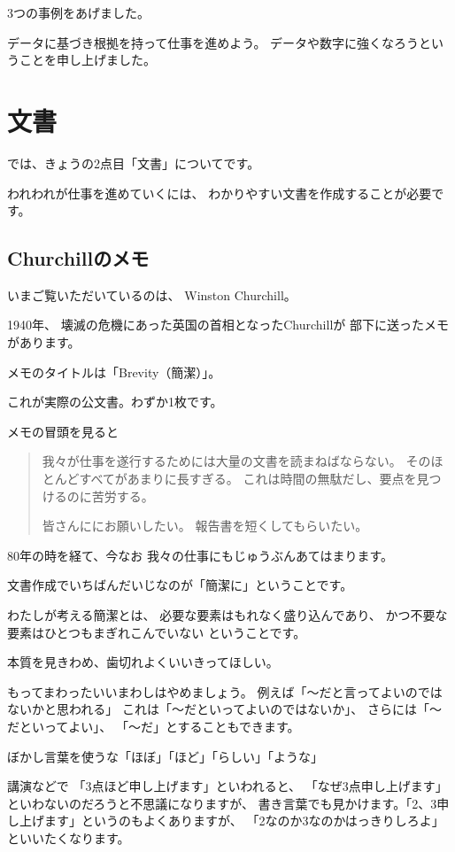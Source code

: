 \documentclass[uplatex,jis2004,dvipdfmx,12pt]{jsarticle}
\begin{document}
3つの事例をあげました。

データに基づき根拠を持って仕事を進めよう。
データや数字に強くなろうということを申し上げました。


\section{文書}

では、きょうの2点目「文書」についてです。

われわれが仕事を進めていくには、
わかりやすい文書を作成することが必要です。

\subsection{Churchillのメモ}

いまご覧いただいているのは、
Winston Churchill。

1940年、
壊滅の危機にあった英国の首相となったChurchillが
部下に送ったメモがあります。

メモのタイトルは「Brevity（簡潔）」。

これが実際の公文書。わずか1枚です。

メモの冒頭を見ると

\begin{quote}
我々が仕事を遂行するためには大量の文書を読まねばならない。
そのほとんどすべてがあまりに長すぎる。
これは時間の無駄だし、要点を見つけるのに苦労する。

皆さんににお願いしたい。
報告書を短くしてもらいたい。
\end{quote}



80年の時を経て、今なお
我々の仕事にもじゅうぶんあてはまります。

文書作成でいちばんだいじなのが「簡潔に」ということです。

わたしが考える簡潔とは、
必要な要素はもれなく盛り込んであり、
かつ不要な要素はひとつもまぎれこんでいない
ということです。

本質を見きわめ、歯切れよくいいきってほしい。


もってまわったいいまわしはやめましょう。
例えば「～だと言ってよいのではないかと思われる」
これは「～だといってよいのではないか」、
さらには「～だといってよい」、
「～だ」とすることもできます。

ぼかし言葉を使うな「ほぼ」「ほど」「らしい」「ような」

講演などで
「3点ほど申し上げます」といわれると、
「なぜ3点申し上げます」といわないのだろうと不思議になりますが、
書き言葉でも見かけます。「2、3申し上げます」というのもよくありますが、
「2なのか3なのかはっきりしろよ」といいたくなります。
\fi
\end{document}
